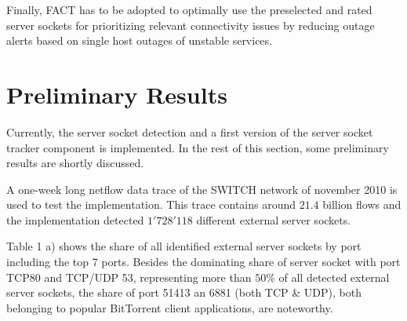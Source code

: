 \documentclass{sigcomm-alternate}
\begin{document}
Finally, FACT has to be adopted to optimally use the preselected and rated 
server sockets for prioritizing relevant connectivity issues by reducing 
outage alerts based on single host outages of unstable services.

\section{Preliminary Results} 
Currently, the server socket detection and a first version of the 
server socket tracker component is implemented. In the 
rest of this section, some preliminary results are shortly discussed. 

A one-week long netflow data trace of the SWITCH network of november 2010 is used to test the
implementation. This trace contains around $21.4$ billion flows and
the implementation detected $1'728'118$ different external server sockets.

Table 1 a) shows the share of all identified external server sockets by port including the top 7 ports. Besides the dominating share
of server socket with port TCP80 and TCP/UDP 53, representing more than $50\%$ of all detected external server sockets,
the share of port 51413 an 6881 (both TCP \& UDP), both belonging to popular BitTorrent client applications, are noteworthy. 
\end{document}
